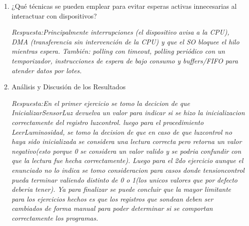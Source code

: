 \documentclass[11pt, a4paper]{article}
\begin{document}
\begin{enumerate}[leftmargin=*, label=\arabic*.]
    \item ¿Qué técnicas se pueden emplear para evitar esperas activas innecesarias al interactuar con dispositivos?
    
    \vspace{0.2cm}
    \textit{Respuesta:Principalmente interrupciones (el dispositivo avisa a la CPU), DMA (transferencia sin intervención de la CPU) y que el SO bloquee el hilo mientras espera. También: polling con timeout, polling periódico con un temporizador, instrucciones de espera de bajo consumo y buffers/FIFO para atender datos por lotes.}
    \vspace{1.5cm}

    \item Análisis y Discusión de los Resultados
    
    \vspace{0.2cm}
    \textit{Respuesta:En el primer ejercicio se tomo la decicion de que InicializarSensorLuz devuelva un valor para indicar si se hizo la inicializacion correctamente del registro luzcontrol. luego para el procedimiento LeerLuminosidad, se tomo la decision de que en caso de que luzcontrol no haya sido inicializada se considera una lectura correcta pero retorna un valor negativo(esto porque 0 se considera un valor valido y se podria confundir con que la lectura fue hecha correctamente). Luego para el 2do ejercicio aunque el enunciado no lo indica se tomo consideracion para casos donde tensioncontrol pueda terminar valiendo distinto de 0 o 1(los unicos valores que por defecto deberia tener). Ya para finalizar se puede concluir que la mayor limitante para los ejercicios hechos es que los registros que sondean deben ser cambiados de forma manual para poder determinar si se comportan correctamente los programas.}
    \vspace{2cm}

\end{enumerate}
\end{document}
